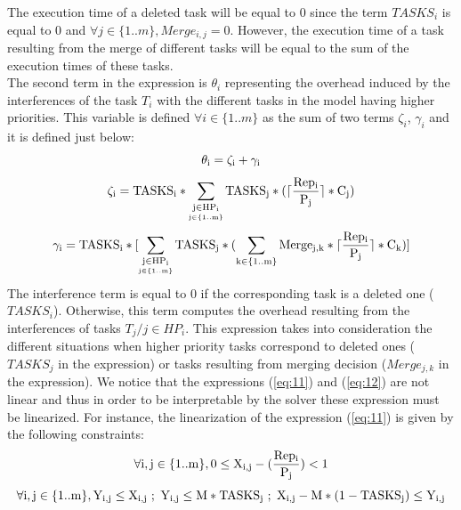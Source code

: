 \documentclass[runningheads,a4paper]{llncs}
\begin{document}
The execution time of a deleted task will be equal to 0 since the term $TASKS_i$ is equal to 0 and  $\forall j \in \{1..m\}, Merge_{i,j}=0$. However, the execution time of a task resulting from the merge of different tasks will be equal to the sum of the execution times of these tasks. 
\\The second term in the expression is $\theta_i$ representing the overhead induced by the interferences of the task $T_i$ with the different tasks in the model having higher priorities. This variable is defined $\forall{i \in \{1..m\}}$ as the sum of two terms $\zeta_i$, $\gamma_i$ and it is defined just below:  
\begin{equation}
\footnotesize{\mathrm{\theta_i = \zeta_i + \gamma_i }}
\label{eq:10}
\end{equation}
\begin{equation}
\footnotesize{\mathrm{\zeta_i= TASKS_i * \sum_{\underset{j \in \{1..m\}}{ j \in{HP_i}}} TASKS_j *(\lceil \frac{Rep_i}{P_j}\rceil*C_j)}}
\label{eq:11}
\end{equation}
\begin{equation}
\footnotesize{\mathrm{\gamma_i= TASKS_i * [\sum_{\underset{j \in \{1..m\}}{ j \in {HP_i}}} TASKS_j *(\sum_{k \in \{1..m\}} Merge_{j,k} *\lceil \frac{Rep_i}{P_j}\rceil*C_k)]}}
\label{eq:12}
\end{equation}
The interference term is equal to 0 if the corresponding task is a deleted one ($TASKS_i$). Otherwise, this term computes the overhead resulting from the interferences of tasks $T_j / j \in HP_i$. This expression takes into consideration the different situations when higher priority tasks correspond to deleted ones ($TASKS_j$ in the expression) or tasks resulting from merging decision ($Merge_{j,k}$ in the expression). 
We notice that the expressions (\ref{eq:11}) and (\ref{eq:12}) are not linear and thus in order to be interpretable by the solver these expression must be linearized. For instance, the linearization of the expression (\ref{eq:11}) is given by the following constraints: 
\begin{equation}
\footnotesize{\mathrm{\forall{i,j \in \{1..m\}}, 0 \leq X_{i,j}- (\frac{Rep_i}{P_j})}< 1}
\label{eq:13}
\end{equation}
\begin{equation}
\footnotesize{\mathrm{\forall{i,j \in \{1..m\}}, Y_{i,j} \leq X_{i,j}}} \ ; \
\footnotesize{\mathrm{ Y_{i,j} \leq M*TASKS_j}} \ ; \
\footnotesize{\mathrm{ X_{i,j} - M*(1-TASKS_j) \leq Y_{i,j}}}
\label{eq:14}
\end{equation}
\end{document}
